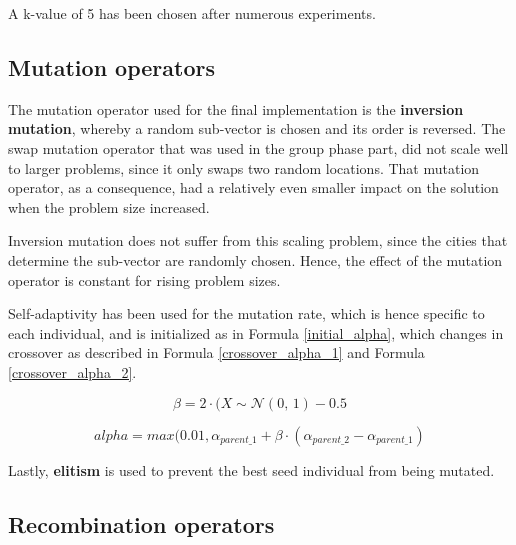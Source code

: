 \documentclass[a4paper,10pt]{article}
\newcommand{\ReplaceMe}[1]{{\color{blue}#1}}
\begin{document}
A k-value of 5 has been chosen after numerous experiments.

\subsection{Mutation operators}
\label{mutation}
The mutation operator used for the final implementation is the \textbf{inversion mutation}, whereby a random sub-vector is chosen and its order is reversed. The swap mutation operator that was used in the group phase part, did not scale well to larger problems, since it only swaps two random locations. That mutation operator, as a consequence, had a relatively even smaller impact on the solution when the problem size increased.

Inversion mutation does not suffer from this scaling problem, since the cities that determine the sub-vector are randomly chosen. Hence, the effect of the mutation operator is constant for rising problem sizes.  

Self-adaptivity has been used for the mutation rate, which is hence specific to each individual, and is initialized as in Formula \ref{initial_alpha}, which changes in crossover as described in Formula \ref{crossover_alpha_1} and Formula \ref{crossover_alpha_2}.

\begin{equation}
    \label{crossover_alpha_1}
    \beta = 2 \cdot (X \sim \mathcal{N}(0,\,1) - 0.5
\end{equation}

\begin{equation}
    \label{crossover_alpha_2}
    alpha = max(0.01, \alpha_{parent\_1} + \beta \cdot (\alpha_{parent\_2} - \alpha_{parent\_1})
\end{equation}

Lastly, \textbf{elitism} is used to prevent the best seed individual from being mutated.

\subsection{Recombination operators}
\label{recombination}
\end{document}
